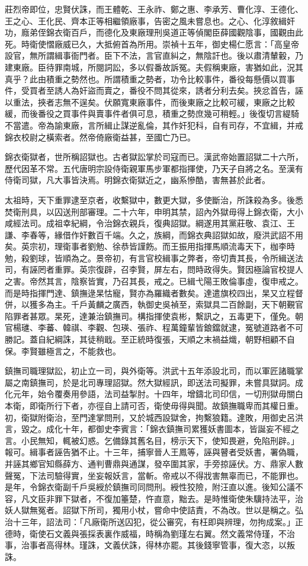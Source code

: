 莊烈帝即位，忠賢伏誅，而王體乾、王永祚、鄭之惠、李承芳、曹化淳、王德化、王之心、王化民、齊本正等相繼領廠事，告密之風未嘗息也。之心、化淳敘緝奸功，廕弟侄錦衣衛百戶，而德化及東廠理刑吳道正等偵閣臣薛國觀陰事，國觀由此死。時衛使慴廠威已久，大抵俯首為所用。崇禎十五年，御史楊仁愿言：「高皇帝設官，無所謂緝事衙門者。臣下不法，言官直糾之，無陰訐也。後以肅清輦轂，乃建東廠。臣待罪南城，所閱詞訟，多以假番故訴冤。夫假稱東廠，害猶如此，況其真乎？此由積重之勢然也。所謂積重之勢者，功令比較事件，番役每懸價以買事件，受買者至誘人為奸盜而賣之，番役不問其從來，誘者分利去矣。挾忿首告，誣以重法，挾者志無不逞矣。伏願寬東廠事件，而後東廠之比較可緩，東廠之比較緩，而後番役之買事件與賣事件者俱可息，積重之勢庶幾可稍輕。」後復切言緹騎不當遣。帝為諭東廠，言所緝止謀逆亂倫，其作奸犯科，自有司存，不宜緝，并戒錦衣校尉之橫索者。然帝倚廠衛益甚，至國亡乃已。

錦衣衛獄者，世所稱詔獄也。古者獄訟掌於司寇而已。漢武帝始置詔獄二十六所，歷代因革不常。五代唐明宗設侍衛親軍馬步軍都指揮使，乃天子自將之名。至漢有侍衛司獄，凡大事皆決焉。明錦衣衛獄近之，幽系慘酷，害無甚於此者。

太祖時，天下重罪逮至京者，收繫獄中，數更大獄，多使斷治，所誅殺為多。後悉焚衛刑具，以囚送刑部審理。二十六年，申明其禁，詔內外獄毋得上錦衣衛，大小咸經法司。成祖幸紀綱，令治錦衣親兵，復典詔獄。綱遂用其黨莊敬、袁江、王謙、李春等，緣借作奸數百千端。久之，族綱，而錦衣典詔獄如故，廢洪武詔不用矣。英宗初，理衛事者劉勉、徐恭皆謹飭。而王振用指揮馬順流毒天下，枷李時勉，殺劉球，皆順為之。景帝初，有言官校緝事之弊者，帝切責其長，令所緝送法司，有誣罔者重罪。英宗復辟，召李賢，屏左右，問時政得失。賢因極論官校提人之害。帝然其言，陰察皆實，乃召其長，戒之。已緝弋陽王敗倫事虛，復申戒之。而是時指揮門達、鎮撫逯杲怙寵，賢亦為羅織者數矣。達遣旗校四出，杲又立程督併，以獲多為主。千戶黃麟之廣西，執御史吳禎至，索獄具二百餘副，天下朝覲官陷罪者甚眾。杲死，達兼治鎮撫司。構指揮使袁彬，繫訊之，五毒更下，僅免。朝官楊璡、李蕃、韓祺、李觀、包瑛、張祚、程萬鐘輩皆鋃鐺就逮，冤號道路者不可勝記。蓋自紀綱誅，其徒稍戢。至正統時復張，天順之末禍益熾，朝野相顧不自保。李賢雖極言之，不能救也。

鎮撫司職理獄訟，初止立一司，與外衛等。洪武十五年添設北司，而以軍匠諸職掌屬之南鎮撫司，於是北司專理詔獄。然大獄經訊，即送法司擬罪，未嘗具獄詞。成化元年，始令覆奏用參語，法司益掣肘。十四年，增鑄北司印信，一切刑獄毋關白本衛，即衛所行下者，亦徑自上請可否，衛使毋得與聞。故鎮撫職卑而其權日重。初，衛獄附衛治，至門達掌問刑，又於城西設獄舍，拘繫狼籍。達敗，用御史呂洪言，毀之。成化十年，都御史李賓言：「錦衣鎮撫司累獲妖書圖本，皆誕妄不經之言。小民無知，輒被幻惑。乞備錄其舊名目，榜示天下，使知畏避，免陷刑辟。」報可。緝事者誣告猶不止。十三年，捕寧晉人王鳳等，誣與瞽者受妖書，署偽職，并誣其鄉官知縣薛方、通判曹鼎與通謀，發卒圍其家，手旁掠誣伏。方、鼎家人數聲冤，下法司驗得實，坐妄報妖言，當斬。帝戒以不得戕害無辜而已，不能罪也。是年，令錦衣衛副千戶吳綬於鎮撫司同問刑。綬性狡險，附汪直以進。後知公議不容，凡文臣非罪下獄者，不復加箠楚，忤直意，黜去。是時惟衛使朱驥持法平，治妖人獄無冤者。詔獄下所司，獨用小杖，嘗命中使詰責，不為改。世以是稱之。弘治十三年，詔法司：「凡廠衛所送囚犯，從公審究，有枉即與辨理，勿拘成案。」正德時，衛使石文義與張採表裏作威福，時稱為劉瑾左右翼。然文義常侍瑾，不治事，治事者高得林。瑾誅，文義伏誅，得林亦罷。其後錢寧管事，復大恣，以叛誅。

